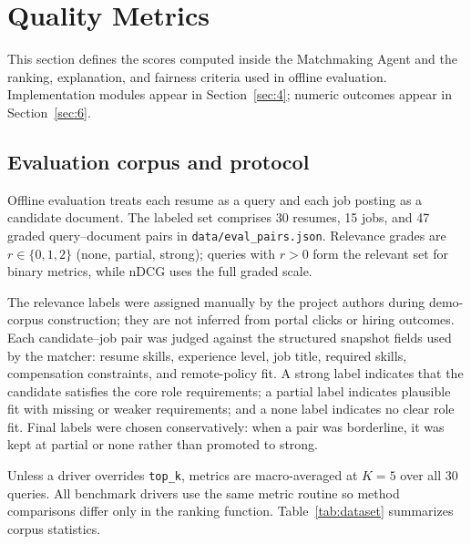 \section{Quality Metrics}\label{sec:5}

This section defines the scores computed inside the Matchmaking Agent and the ranking, explanation, and fairness criteria used in offline evaluation.
Implementation modules appear in Section~\ref{sec:4}; numeric outcomes appear in Section~\ref{sec:6}.

\subsection{Evaluation corpus and protocol}\label{sec:5-corpus}

Offline evaluation treats each resume as a query and each job posting as a candidate document.
The labeled set comprises 30 resumes, 15 jobs, and 47 graded query--document pairs in \texttt{data/eval\_pairs.json}.
Relevance grades are $r \in \{0,1,2\}$ (none, partial, strong); queries with $r>0$ form the relevant set for binary metrics, while nDCG uses the full graded scale.

The relevance labels were assigned manually by the project authors during demo-corpus construction; they are not inferred from portal clicks or hiring outcomes.
Each candidate--job pair was judged against the structured snapshot fields used by the matcher: resume skills, experience level, job title, required skills, compensation constraints, and remote-policy fit.
A strong label indicates that the candidate satisfies the core role requirements; a partial label indicates plausible fit with missing or weaker requirements; and a none label indicates no clear role fit.
Final labels were chosen conservatively: when a pair was borderline, it was kept at partial or none rather than promoted to strong.

Unless a driver overrides \texttt{top\_k}, metrics are macro-averaged at $K{=}5$ over all 30 queries.
All benchmark drivers use the same metric routine so method comparisons differ only in the ranking function.
Table~\ref{tab:dataset} summarizes corpus statistics.

